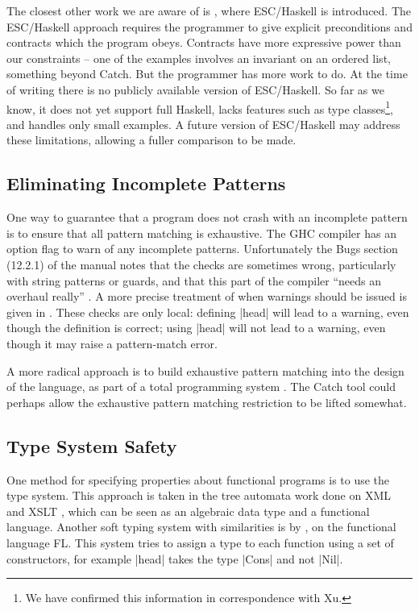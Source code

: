\documentclass[preprint]{sigplanconf}
\begin{document}
The closest other work we are aware of is \cite{esc_haskell}, where ESC/Haskell is introduced. The ESC/Haskell approach requires the programmer to give explicit preconditions and contracts which the program obeys. Contracts have more expressive power than our constraints -- one of the examples involves an invariant on an ordered list, something beyond Catch. But the programmer has more work to do. At the time of writing there is no publicly available version of ESC/Haskell. So far as we know, it does not yet support full Haskell, lacks features such as type classes\footnote{We have confirmed this information in correspondence with Xu.}, and handles only small examples. A future version of ESC/Haskell may address these limitations, allowing a fuller comparison to be made.


\subsection{Eliminating Incomplete Patterns}

One way to guarantee that a program does not crash with an incomplete pattern is to ensure that all pattern matching is exhaustive. The GHC compiler \cite{ghc} has an option flag to warn of any incomplete patterns. Unfortunately the Bugs section (12.2.1) of the manual notes that the checks are sometimes wrong, particularly with string patterns or guards, and that this part of the compiler ``needs an overhaul really'' \cite{ghc}. A more precise treatment of when warnings should be issued is given in \citet{maranget:pattern_warnings}. These checks are only local: defining |head| will lead to a warning, even though the definition is correct; using |head| will not lead to a warning, even though it may raise a pattern-match error.

A more radical approach is to build exhaustive pattern matching into the design of the language, as part of a total programming system \cite{turner:total}. The Catch tool could perhaps allow the exhaustive pattern matching restriction to be lifted somewhat.


\subsection{Type System Safety}

One method for specifying properties about functional programs is to use the type system. This approach is taken in the tree automata work done on XML and XSLT \cite{static_xslt}, which can be seen as an algebraic data type and a functional language. Another soft typing system with similarities is by \citet{aiken:type_infer}, on the functional language FL. This system tries to assign a type to each function using a set of constructors, for example |head| takes the type |Cons| and not |Nil|.
\end{document}
